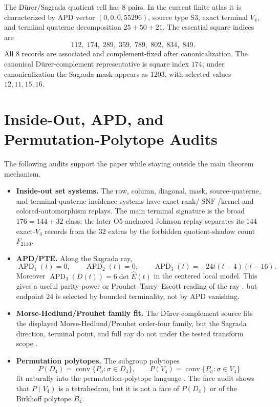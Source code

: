 \documentclass[11pt,a4paper]{article}
\theoremstyle{definition}
\theoremstyle{remark}
\newcommand{\conv}{\operatorname{conv}}
\newcommand{\SNF}{\operatorname{SNF}}
\newcommand{\APD}{\operatorname{APD}}
\newcommand{\Durer}{D\"urer\xspace}
\begin{document}
The \Durer/Sagrada quotient cell has \(8\) pairs.  In the current finite atlas
it is characterized by APD vector \((0,0,0,55296)\), source type S3, exact
terminal \(V_4\), and terminal quaterne decomposition \(25+50+21\).  The
essential square indices are
\[
112,\;174,\;289,\;359,\;789,\;802,\;834,\;849.
\]
All \(8\) records are associated and complement-fixed after
canonicalization.  The canonical \Durer-complement representative is square
index \(174\); under canonicalization the Sagrada mask appears as \(1203\),
with selected values \(12,11,15,16\).

\section{Inside-Out, APD, and Permutation-Polytope Audits}
\label{app:secondary-audits}

The following audits support the paper while staying outside the main theorem
mechanism.

\begin{itemize}[leftmargin=*]
\item \textbf{Inside-out set systems.}  The row, column, diagonal, mask,
source-quaterne, and terminal-quaterne incidence systems have exact
rank/\(\SNF\)/kernel and colored-automorphism replays.  The main terminal
signature is the broad \(176=144+32\) class; the later O5-anchored Johnson
replay separates its \(144\) exact-\(V_4\) records from the \(32\) extras by
the forbidden quotient-shadow count \(F_{2110}\).
\item \textbf{APD/PTE.}  Along the Sagrada ray,
\[
\APD_1(t)=0,\qquad \APD_2(t)=0,\qquad
\APD_3(t)=-24t(t-4)(t-16).
\]
Moreover \(\APD_3(D(t))=6\det \widehat E(t)\) in the centered local model.
This gives a useful parity-power or Prouhet--Tarry--Escott reading of the
ray \cite{takemuraAPD,takemura880}, but endpoint \(24\) is selected by
bounded terminality, not by APD vanishing.
\item \textbf{Morse-Hedlund/Prouhet family fit.}  The \Durer-complement source
fits the displayed Morse-Hedlund/Prouhet order-four family, but the Sagrada
direction, terminal point, and full ray do not under the tested transform
scope \cite{sergeyevSymmetricSums}.
\item \textbf{Permutation polytopes.}  The subgroup polytopes
\[
P(D_4)=\conv\{P_\sigma:\sigma\in D_4\},
\qquad
P(V_4)=\conv\{P_\sigma:\sigma\in V_4\}
\]
fit naturally into the permutation-polytope language
\cite{baumeisterPermutationPolytopes,guralnickPerkinson}.  The face audit
shows that \(P(V_4)\) is a tetrahedron, but it is not a face of \(P(D_4)\) or
of the Birkhoff polytope \(B_4\).
\end{itemize}
\end{document}
